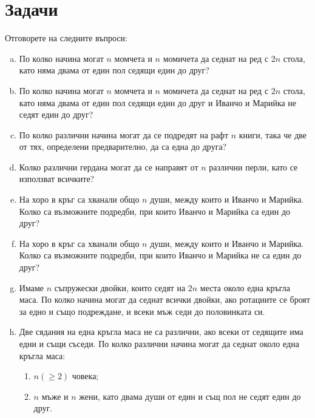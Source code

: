 \section{Задачи}

\begin{problem}
  Отговорете на следните въпроси:
  \begin{enumerate}[a)]
  \item
    По колко начина могат $n$ момчета и $n$ момичета да седнат на ред с $2n$ стола, като няма двама от един пол седящи един до друг?
  \item
    По колко начина могат $n$ момчета и $n$ момичета да седнат на ред с $2n$ стола, като няма двама от един пол седящи един до друг и Иванчо и Марийка не седят един до друг? 
  \item
    По колко различни начина могат да се подредят на рафт $n$ книги, така че две от тях, определени предварително, да са една до друга?
  \item
    Колко различни гердана могат да се направят от $n$ различни перли, като се използват всичките?
  \item
    На хоро в кръг са хванали общо $n$ души, между които и Иванчо и Марийка.
    Колко са възможните подредби, при които Иванчо и Марийка са един до друг?
 \item
    На хоро в кръг са хванали общо $n$ души, между които и Иванчо и Марийка.
    Колко са възможните подредби, при които Иванчо и Марийка не са един до друг?
  \item
    Имаме $n$ съпружески двойки, които седят на $2n$ места около една кръгла маса. 
    По колко начина могат да седнат всички двойки, ако ротациите се броят за едно и също подреждане, и
    всеки мъж седи до половинката си.
  \item
    Две сядания на една кръгла маса не са различни, ако всеки от седящите има едни и същи съседи.
    По колко различни начина могат да седнат около една кръгла маса:
    \begin{enumerate}
    \item
      $n (\geq 2)$ човека;
    \item
      $n$ мъже и $n$ жени, като двама души от един и същ пол не седят един до друг.
    \end{enumerate}
  \end{enumerate}
\end{problem}

